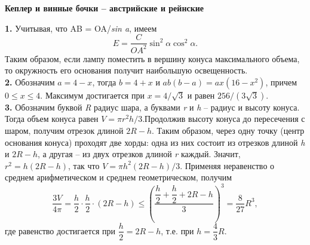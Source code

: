 \begin{multicols}{2}
    \begin{center}
        \textbf{Кеплер и винные бочки – австрийские и рейнские}
    \end{center}
    \textbf{1.} Учитывая, что AB = OA/\emph{sin a}, имеем \[E = \frac{C}{OA^2} \sin^2 \alpha \cos^2 \alpha . \]  Таким образом, если лампу поместить в вершину конуса максимального объема, то окружность его основания получит наибольшую освещенность.\\  
    \textbf{2.} Обозначим $a = 4 - x$, тогда $b = 4 + x$ и $ab(b - a) = ax(16 - x^2)$, причем $0\leq x \leq 4$. Максимум достигается при $x = 4/\sqrt{3}$ и равен $256/(3\sqrt{3})$. \\ 
    \textbf{3.} Обозначим буквой \emph{R} радиус шара, а буквами \emph{r} и \emph{h} – радиус и высоту конуса. Тогда объем конуса равен $V = \pi r^2h/3$.Продолжив высоту конуса до пересечения с шаром, получим отрезок длиной $2R - h$. Таким образом, через одну точку (центр основания конуса) проходят две хорды: одна из них состоит из отрезков длиной \emph{h} и $2R - h$, а другая – из двух отрезков длиной \emph{r} каждый. Значит, $r^2 = h(2R - h)$, так что $V = \pi h^2(2R - h)/3$. Применяя неравенство о среднем арифметическом и среднем геометрическом, получим \[\frac{3V}{4\pi} = \frac{h}{2}\cdot\frac{h}{2}\cdot(2R - h)\leq\left(\frac{\dfrac{h}{2} + \dfrac{h}{2} + 2R - h}{3}\right)^3 = \frac{8}{27}R^3,\] где равенство достигается при $\dfrac{h}{2} = 2R - h$, т.е. при $h = \dfrac{4}{3}R$.
\end{multicols}